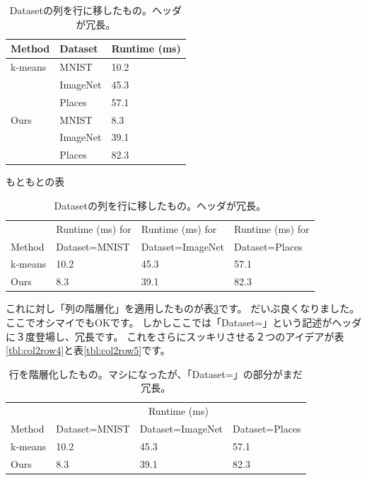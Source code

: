 \documentclass[uplatex,onecolumn,9pt,dvipdfmx]{jsarticle}
\newcommand{\Tref}[1]{表\ref{#1}}
\begin{document}
\begin{table}[h]
    \begin{minipage}{0.32\linewidth}
        \centering
        \begin{tabular}{@{}lll@{}} \toprule
            Method & Dataset & Runtime (ms) \\ \midrule
            k-means   & MNIST    & 10.2 \\ 
                      & ImageNet & 45.3 \\ 
                      & Places   & 57.1 \\ 
            Ours      & MNIST    & 8.3 \\ 
                      & ImageNet & 39.1 \\ 
                      & Places   & 82.3 \\ \bottomrule   
        \end{tabular}
        \caption{もともとの表}
        \label{tbl:col2row1}
    \end{minipage}
    \hfill
    \begin{minipage}{0.67\linewidth}
        \centering
        \begin{tabular}{@{}llll@{}} \toprule
                   & Runtime (ms) for & Runtime (ms) for & Runtime (ms) for         \\
            Method & Dataset=MNIST & Dataset=ImageNet & Dataset=Places \\ \midrule
            k-means   & 10.2 & 45.3 & 57.1 \\ 
            Ours      & 8.3  & 39.1 & 82.3 \\ \bottomrule   
        \end{tabular}
        \caption{Datasetの列を行に移したもの。ヘッダが冗長。}
        \label{tbl:col2row2}
    \end{minipage}
\end{table}

これに対し「列の階層化」を適用したものが\Tref{tbl:col2row3}です。
だいぶ良くなりました。ここでオシマイでもOKです。
しかしここでは「Dataset=」という記述がヘッダに３度登場し、冗長です。
これをさらにスッキリさせる２つのアイデアが\Tref{tbl:col2row4}と\Tref{tbl:col2row5}です。


\begin{table}[h]
    \centering
    \begin{tabular}{@{}llll@{}} \toprule
                & \multicolumn{3}{c}{Runtime (ms)}  \\ \cmidrule(l){2-4}
        Method & Dataset=MNIST & Dataset=ImageNet & Dataset=Places \\ \midrule
        k-means   & 10.2 & 45.3 & 57.1 \\ 
        Ours      & 8.3  & 39.1 & 82.3 \\ \bottomrule   
    \end{tabular}
    \caption{行を階層化したもの。マシになったが、「Dataset=」の部分がまだ冗長。}
    \label{tbl:col2row3}
\end{table}
\end{document}
